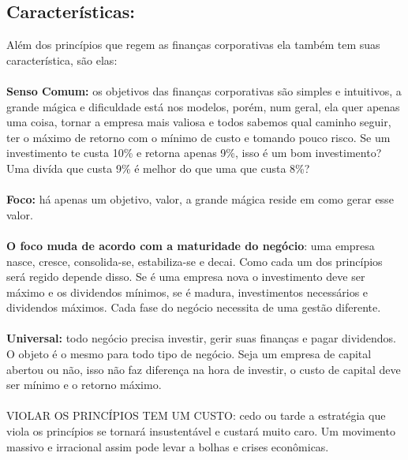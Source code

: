 \subsection*{Características:}
Além dos princípios que regem as finanças corporativas ela também tem suas característica, são elas:
\\~\\
\textbf{Senso Comum:} os objetivos das finanças corporativas são simples e intuitivos, a grande mágica e dificuldade está nos modelos, porém, num geral, ela quer apenas uma coisa, tornar a empresa mais valiosa e todos sabemos qual caminho seguir, ter o máximo de retorno com o mínimo de custo e tomando pouco risco. Se um investimento te custa 10\% e retorna apenas 9\%, isso é um bom investimento? Uma divída que custa 9\% é melhor do que uma que custa 8\%? 
\\~\\
\textbf{Foco:} há apenas um objetivo, valor, a grande mágica reside em como gerar esse valor.
\\~\\
\textbf{O foco muda de acordo com a maturidade do negócio}: uma empresa nasce, cresce, consolida-se, estabiliza-se e decai. Como cada um dos princípios será regido depende disso. Se é uma empresa nova o investimento deve ser máximo e os dividendos mínimos, se é madura, investimentos necessários e dividendos máximos. Cada fase do negócio necessita de uma gestão diferente.
\\~\\
\textbf{Universal:} todo negócio precisa investir, gerir suas finanças e pagar dividendos. O objeto é o mesmo para todo tipo de negócio. Seja um empresa de capital abertou ou não, isso não faz diferença na hora de investir, o custo de capital deve ser mínimo e o retorno máximo.
\\~\\
VIOLAR OS PRINCÍPIOS TEM UM CUSTO: cedo ou tarde a estratégia que viola os princípios se tornará insustentável e custará muito caro. Um movimento massivo e irracional assim pode levar a bolhas e crises econômicas.




























